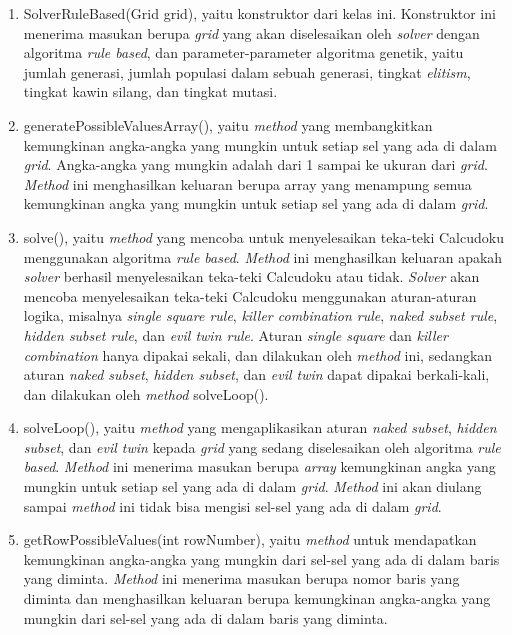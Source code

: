 \begin{enumerate}
\item SolverRuleBased(Grid grid), yaitu konstruktor dari kelas ini. Konstruktor ini menerima masukan berupa \textit{grid} yang akan diselesaikan oleh \textit{solver} dengan algoritma \textit{rule based}, dan parameter-parameter algoritma genetik, yaitu jumlah generasi, jumlah populasi dalam sebuah generasi, tingkat \textit{elitism}, tingkat kawin silang, dan tingkat mutasi.
\item generatePossibleValuesArray(), yaitu \textit{method} yang membangkitkan kemungkinan angka-angka yang mungkin untuk setiap sel yang ada di dalam \textit{grid}. Angka-angka yang mungkin adalah dari 1 sampai ke ukuran dari \textit{grid}. \textit{Method} ini menghasilkan keluaran berupa array yang menampung semua kemungkinan angka yang mungkin untuk setiap sel yang ada di dalam \textit{grid}.
\item solve(), yaitu \textit{method} yang mencoba untuk menyelesaikan teka-teki Calcudoku menggunakan algoritma \textit{rule based}. \textit{Method} ini menghasilkan keluaran apakah \textit{solver} berhasil menyelesaikan teka-teki Calcudoku atau tidak. \textit{Solver} akan mencoba menyelesaikan teka-teki Calcudoku menggunakan aturan-aturan logika, misalnya \textit{single square rule}, \textit{killer combination rule}, \textit{naked subset rule}, \textit{hidden subset rule}, dan \textit{evil twin rule}. Aturan \textit{single square} dan \textit{killer combination} hanya dipakai sekali, dan dilakukan oleh \textit{method} ini, sedangkan aturan \textit{naked subset}, \textit{hidden subset}, dan \textit{evil twin} dapat dipakai berkali-kali, dan dilakukan oleh \textit{method} solveLoop().
\item solveLoop(), yaitu \textit{method} yang mengaplikasikan aturan \textit{naked subset}, \textit{hidden subset}, dan \textit{evil twin} kepada \textit{grid} yang sedang diselesaikan oleh algoritma \textit{rule based}. \textit{Method} ini menerima masukan berupa \textit{array} kemungkinan angka yang mungkin untuk setiap sel yang ada di dalam \textit{grid}. \textit{Method} ini akan diulang sampai \textit{method} ini tidak bisa mengisi sel-sel yang ada di dalam \textit{grid}.
\item getRowPossibleValues(int rowNumber), yaitu \textit{method} untuk mendapatkan kemungkinan angka-angka yang mungkin dari sel-sel yang ada di dalam baris yang diminta. \textit{Method} ini menerima masukan berupa nomor baris yang diminta dan menghasilkan keluaran berupa kemungkinan angka-angka yang mungkin dari sel-sel yang ada di dalam baris yang diminta.

\end{enumerate}
